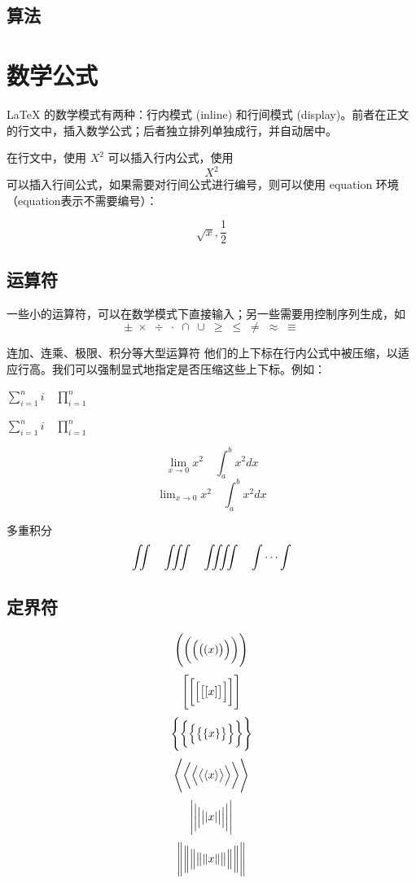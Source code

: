 \subsection{算法}

\section{数学公式}

LaTeX 的数学模式有两种：行内模式 (inline) 和行间模式 (display)。前者在正文的行文中，插入数学公式；后者独立排列单独成行，并自动居中。

在行文中，使用 $ X^2 $ 可以插入行内公式，使用 \[ X^2 \] 可以插入行间公式，如果需要对行间公式进行编号，则可以使用 equation 环境（equation表示不需要编号）：

\begin{equation}
\sqrt{x}, \frac{1}{2}
\end{equation}

\subsection{运算符} 

一些小的运算符，可以在数学模式下直接输入；另一些需要用控制序列生成，如
\[ \pm\; \times \; \div\; \cdot\; \cap\; \cup\;
\geq\; \leq\; \neq\; \approx \; \equiv \]

连加、连乘、极限、积分等大型运算符 %
他们的上下标在行内公式中被压缩，以适应行高。我们可以强制显式地指定是否压缩这些上下标。例如：

$ \sum_{i=1}^n i\quad \prod_{i=1}^n $ 

$ \sum\limits _{i=1}^n i\quad \prod\limits _{i=1}^n $

\[ \lim_{x\to0}x^2 \quad \int_a^b x^2 dx \]
\[ \lim\nolimits _{x\to0}x^2\quad \int\nolimits_a^b x^2 dx \]

多重积分
\[ \iint\quad \iiint\quad \iiiint\quad \idotsint \]

\subsection{定界符}

\[ \Biggl(\biggl(\Bigl(\bigl((x)\bigr)\Bigr)\biggr)\Biggr) \]
\[ \Biggl[\biggl[\Bigl[\bigl[[x]\bigr]\Bigr]\biggr]\Biggr] \]
\[ \Biggl \{\biggl \{\Bigl \{\bigl \{\{x\}\bigr \}\Bigr \}\biggr \}\Biggr\} \]
\[ \Biggl\langle\biggl\langle\Bigl\langle\bigl\langle\langle x
\rangle\bigr\rangle\Bigr\rangle\biggr\rangle\Biggr\rangle \]
\[ \Biggl\lvert\biggl\lvert\Bigl\lvert\bigl\lvert\lvert x
\rvert\bigr\rvert\Bigr\rvert\biggr\rvert\Biggr\rvert \]
\[ \Biggl\lVert\biggl\lVert\Bigl\lVert\bigl\lVert\lVert x
\rVert\bigr\rVert\Bigr\rVert\biggr\rVert\Biggr\rVert \]

